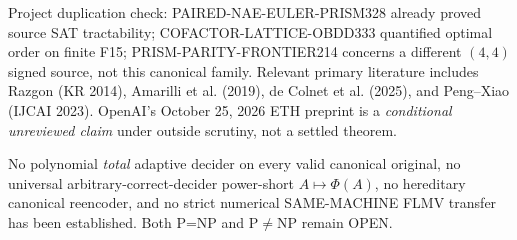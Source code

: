 \documentclass[11pt]{article}
\begin{document}
Project duplication check: PAIRED-NAE-EULER-PRISM328 already proved source SAT tractability; COFACTOR-LATTICE-OBDD333 quantified optimal order on finite F15; PRISM-PARITY-FRONTIER214 concerns a different $(4,4)$ signed source, not this canonical family. Relevant primary literature includes Razgon (KR 2014), Amarilli et al. (2019), de Colnet et al. (2025), and Peng--Xiao (IJCAI 2023). OpenAI's October 25, 2026 ETH preprint is a \emph{conditional unreviewed claim} under outside scrutiny, not a settled theorem.

No polynomial \emph{total} adaptive decider on every valid canonical original, no universal arbitrary-correct-decider power-short $A\mapsto\Phi(A)$, no hereditary canonical reencoder, and no strict numerical SAME-MACHINE FLMV transfer has been established. Both P=NP and P$\ne$NP remain OPEN.
\end{document}
